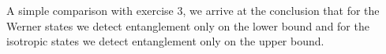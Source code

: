 \documentclass[a4paper]{article}
\newcounter{exercise}
\newenvironment{MyExercise}%
{\begin{mdframed}[style=exercisestyle]}{\end{mdframed}}
\begin{document}
\begin{MyExercise}
    A simple comparison with exercise 3, we arrive at the conclusion that for
    the Werner states we detect entanglement only on the lower bound and for the
    isotropic states we detect entanglement only on the upper bound.
\end{MyExercise}



\nocite{cite1}
\nocite{cite2}
\nocite{cite3}
\nocite{cite4}
\nocite{cite5}
\printbibliography
\end{document}

